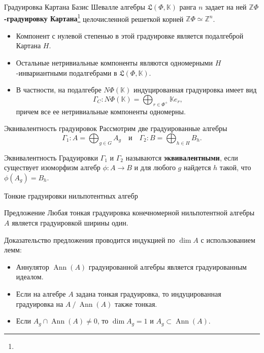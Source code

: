 \documentclass[12pt,aspectratio=169]{beamer}
\DeclareMathOperator{\Ann}{Ann}
\newcommand{\K}{\mathbb{K}}
\newcommand{\quot}[2]{#1\mathbin{/}#2}
\newcommand{\term}[1]{{\color{MainRed}\bfseries #1}}
\newcommand{\sourcefootnote}[1]{\footnote{\slidecite{#1}}}
\begin{document}
\begin{frame}[t]{Градуировка Картана}
    \small
    Базис Шевалле алгебры $\mathfrak{L}(\Phi,\K)$ ранга $n$ задает на ней
    \term{$\mathbb Z\Phi$-градуировку
        Картана}\sourcefootnote{kochetov2013,moody95} целочисленной решеткой корней
    $\mathbb Z\Phi\simeq \mathbb Z^n$.

    \begin{itemize}
        \item Компонент с нулевой степенью в этой градуировке является подалгеброй Картана
              $H$.
        \item Остальные нетривиальные компоненты являются одномерными $H$-инвариантными
              подалгебрами в $\mathfrak L(\Phi,\K)$.
        \item В частности, на подалгебре $N\Phi(\K)$ индуцированная градуировка имеет вид
              \[
                  \Gamma_C\colon N\Phi(\K)=\bigoplus_{r\in\Phi^+}\K e_r,
              \]
              причем все ее нетривиальные компоненты одномерны.
    \end{itemize}
\end{frame}

\begin{frame}[t]{Эквивалентность градуировок}
    Рассмотрим две градуированные алгебры
    \begin{equation}\label{eq:two-graded-algebras}
        \Gamma_1 \colon A = \bigoplus_{g \in G}A_g
        \quad \text{и} \quad
        \Gamma_2 \colon B = \bigoplus_{h \in H}B_h.
    \end{equation}
    \begin{block}{Эквивалентность}
        Градуировки $\Gamma_1$ и $\Gamma_2$ называются \term{эквивалентными}, если существует изоморфизм алгебр $\phi\colon A\to B$ и для любого $g$ найдется $h$ такой, что $\phi(A_g)=B_h$.
    \end{block}
\end{frame}

\begin{frame}[t]{Тонкие градуировки нильпотентных алгебр}
    \begin{block}{Предложение}
        Любая тонкая градуировка конечномерной нильпотентной алгебры $A$ является градуировкой ширины один.
    \end{block}

    Доказательство предложения проводится индукцией по $\dim A$ с использованием
    лемм:

    \begin{itemize}
        \item Аннулятор $\Ann(A)$ градуированной алгебры является градуированным идеалом.

        \item Если на алгебре $A$ задана тонкая градуировка, то индуцированная градуировка на
              $\quot{A}{\Ann(A)}$ также тонкая.

        \item Если $A_g\cap \Ann(A)\ne 0$, то $\dim A_g=1$ и $A_g\subset\Ann(A)$.
    \end{itemize}
\end{frame}
\end{document}
